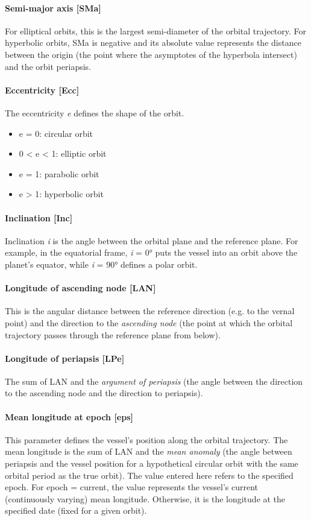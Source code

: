 \documentclass[Orbiter User Manual.tex]{subfiles}
\begin{document}
\paragraph{Semi-major axis [SMa]}
For elliptical orbits, this is the largest semi-diameter of the orbital trajectory. For hyperbolic orbits, SMa is negative and its absolute value represents the distance between the origin (the point where the asymptotes of the hyperbola intersect) and the orbit periapsis.

\paragraph{Eccentricity [Ecc]}
The eccentricity \textit{e} defines the shape of the orbit.

\begin{itemize}
\item e = 0: circular orbit
\item 0 < e < 1: elliptic orbit
\item e = 1: parabolic orbit
\item e > 1: hyperbolic orbit
\end{itemize}

\paragraph{Inclination [Inc]}
Inclination \textit{i} is the angle between the orbital plane and the reference plane. For example, in the equatorial frame, \textit{i} = 0° puts the vessel into an orbit above the planet's equator, while \textit{i} = 90° defines a polar orbit.

\paragraph{Longitude of ascending node [LAN]}
This is the angular distance between the reference direction (e.g. to the vernal point) and the direction to the \textit{ascending node} (the point at which the orbital trajectory passes through the reference plane from below).

\paragraph{Longitude of periapsis [LPe]}
The sum of LAN and the \textit{argument of periapsis} (the angle between the direction to the ascending node and the direction to periapsis).

\paragraph{Mean longitude at epoch [eps]}
This parameter defines the vessel's position along the orbital trajectory. The mean longitude is the sum of LAN and the \textit{mean anomaly} (the angle between periapsis and the vessel position for a hypothetical circular orbit with the same orbital period as the true orbit). The value entered here refers to the specified epoch. For epoch = current, the value represents the vessel's current (continuously varying) mean longitude. Otherwise, it is the longitude at the specified date (fixed for a given orbit).
\end{document}
